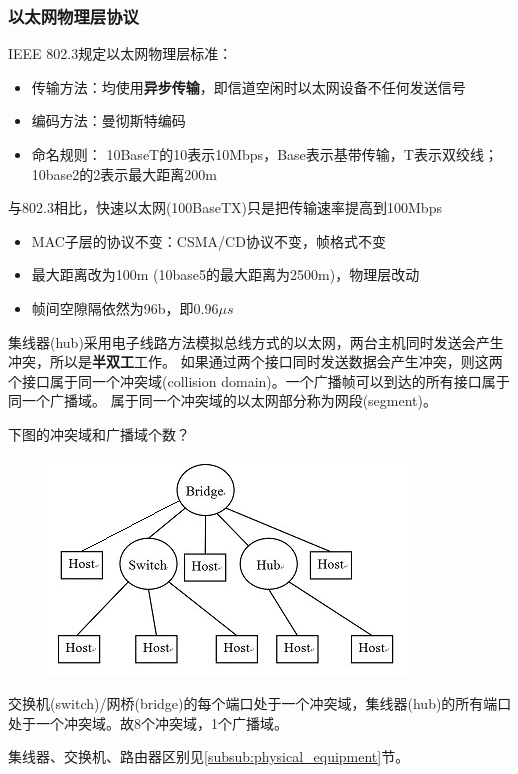 \subsubsection{以太网物理层协议}
IEEE 802.3规定以太网物理层标准：
\begin{itemize}
	\item 传输方法：均使用\textbf{异步传输}，即信道空闲时以太网设备不任何发送信号
	\item 编码方法：曼彻斯特编码
	\item 命名规则： 10BaseT的10表示10Mbps，Base表示基带传输，T表示双绞线；10base2的2表示最大距离200m
\end{itemize}
与802.3相比，快速以太网(100BaseTX)只是把传输速率提高到100Mbps
\begin{itemize}
	\item MAC子层的协议不变：CSMA/CD协议不变，帧格式不变
	\item 最大距离改为100m (10base5的最大距离为2500m)，物理层改动
	\item 帧间空隙隔依然为96b，即$0.96\mu s$
\end{itemize}

集线器(hub)采用电子线路方法模拟总线方式的以太网，两台主机同时发送会产生冲突，所以是\textbf{半双工}工作。
如果通过两个接口同时发送数据会产生冲突，则这两个接口属于同一个冲突域(collision domain)。一个广播帧可以到达的所有接口属于同一个广播域。
属于同一个冲突域的以太网部分称为网段(segment)。
\begin{example}
	下图的冲突域和广播域个数？
	\begin{figure}
		\centering
		\includegraphics[width=0.35\linewidth]{fig/conflict_count.jpg}
	\end{figure}
\end{example}
\begin{analysis}
交换机(switch)/网桥(bridge)的每个端口处于一个冲突域，集线器(hub)的所有端口处于一个冲突域。故8个冲突域，1个广播域。
\end{analysis}

集线器、交换机、路由器区别见\ref{subsub:physical_equipment}节。

